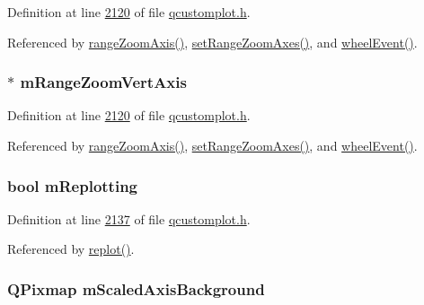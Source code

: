 Definition at line \hyperlink{a00116_source_l02120}{2120} of file \hyperlink{a00116_source}{qcustomplot.\+h}.



Referenced by \hyperlink{a00115_source_l05862}{range\+Zoom\+Axis()}, \hyperlink{a00115_source_l06064}{set\+Range\+Zoom\+Axes()}, and \hyperlink{a00115_source_l07811}{wheel\+Event()}.

\hypertarget{a00116_a16094e9a3c30151c3c820cd9d4894b84}{
\subsubsection[{m\+Range\+Zoom\+Vert\+Axis}]{ $\ast$ m\+Range\+Zoom\+Vert\+Axis}}\label{a00116_a16094e9a3c30151c3c820cd9d4894b84}


Definition at line \hyperlink{a00116_source_l02120}{2120} of file \hyperlink{a00116_source}{qcustomplot.\+h}.



Referenced by \hyperlink{a00115_source_l05862}{range\+Zoom\+Axis()}, \hyperlink{a00115_source_l06064}{set\+Range\+Zoom\+Axes()}, and \hyperlink{a00115_source_l07811}{wheel\+Event()}.

\hypertarget{a00116_a38ce5778fc22072b64b7ccc05963c684}{
\subsubsection[{m\+Replotting}]{\setlength{\rightskip}{0pt plus 5cm}bool m\+Replotting}}\label{a00116_a38ce5778fc22072b64b7ccc05963c684}


Definition at line \hyperlink{a00116_source_l02137}{2137} of file \hyperlink{a00116_source}{qcustomplot.\+h}.



Referenced by \hyperlink{a00115_source_l07221}{replot()}.

\hypertarget{a00116_a9c0be35152f1cb89789149791f99044c}{
\subsubsection[{m\+Scaled\+Axis\+Background}]{\setlength{\rightskip}{0pt plus 5cm}Q\+Pixmap m\+Scaled\+Axis\+Background}}\label{a00116_a9c0be35152f1cb89789149791f99044c}


